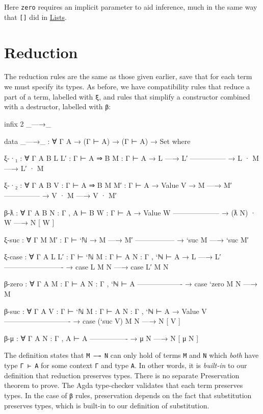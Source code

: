 Here \texttt{zero} requires an implicit parameter to aid inference, much
in the same way that \texttt{{[}{]}} did in
\protect\hyperlink{Lists}{Lists}.

\hypertarget{reduction}{%
\section{Reduction}\label{reduction}}

The reduction rules are the same as those given earlier, save that for
each term we must specify its types. As before, we have compatibility
rules that reduce a part of a term, labelled with \texttt{ξ}, and rules
that simplify a constructor combined with a destructor, labelled with
\texttt{β}:

\begin{fence}
\begin{code}
infix 2 _—→_

data _—→_ : ∀ {Γ A} → (Γ ⊢ A) → (Γ ⊢ A) → Set where

  ξ-·₁ : ∀ {Γ A B} {L L′ : Γ ⊢ A ⇒ B} {M : Γ ⊢ A}
    → L —→ L′
      ---------------
    → L · M —→ L′ · M

  ξ-·₂ : ∀ {Γ A B} {V : Γ ⊢ A ⇒ B} {M M′ : Γ ⊢ A}
    → Value V
    → M —→ M′
      ---------------
    → V · M —→ V · M′

  β-ƛ : ∀ {Γ A B} {N : Γ , A ⊢ B} {W : Γ ⊢ A}
    → Value W
      --------------------
    → (ƛ N) · W —→ N [ W ]

  ξ-suc : ∀ {Γ} {M M′ : Γ ⊢ `ℕ}
    → M —→ M′
      -----------------
    → `suc M —→ `suc M′

  ξ-case : ∀ {Γ A} {L L′ : Γ ⊢ `ℕ} {M : Γ ⊢ A} {N : Γ , `ℕ ⊢ A}
    → L —→ L′
      -------------------------
    → case L M N —→ case L′ M N

  β-zero :  ∀ {Γ A} {M : Γ ⊢ A} {N : Γ , `ℕ ⊢ A}
      -------------------
    → case `zero M N —→ M

  β-suc : ∀ {Γ A} {V : Γ ⊢ `ℕ} {M : Γ ⊢ A} {N : Γ , `ℕ ⊢ A}
    → Value V
      ----------------------------
    → case (`suc V) M N —→ N [ V ]

  β-μ : ∀ {Γ A} {N : Γ , A ⊢ A}
      ----------------
    → μ N —→ N [ μ N ]
\end{code}
\end{fence}

The definition states that \texttt{M\ —→\ N} can only hold of terms
\texttt{M} and \texttt{N} which \emph{both} have type \texttt{Γ\ ⊢\ A}
for some context \texttt{Γ} and type \texttt{A}. In other words, it is
\emph{built-in} to our definition that reduction preserves types. There
is no separate Preservation theorem to prove. The Agda type-checker
validates that each term preserves types. In the case of \texttt{β}
rules, preservation depends on the fact that substitution preserves
types, which is built-in to our definition of substitution.

